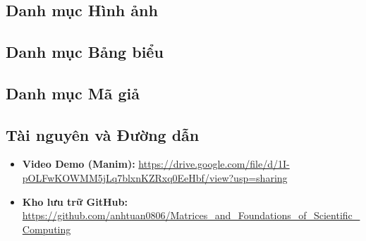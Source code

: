 \newpage
\setcounter{chapter}{4} %
\chapter*{}
{}

\section*{Danh mục Hình ảnh}
{}
\makeatletter
\vspace{-0.5cm} 
\makeatother

\section*{Danh mục Bảng biểu}
{}
\makeatletter
\vspace{-0.5cm}
\makeatother

\section*{Danh mục Mã giả}
{}
\makeatletter
\providecommand*{\l@algorithm}{\@dottedtocline{1}{1.5em}{2.3em}}
\vspace{-0.5cm}
\makeatother

\section*{Tài nguyên và Đường dẫn}
{}

\begin{itemize}
    \item \textbf{Video Demo (Manim):} \url{https://drive.google.com/file/d/1I-pOLFwKOWMM5jLq7blxnKZRxq0EeHbf/view?usp=sharing}
    \item \textbf{Kho lưu trữ GitHub:} \url{https://github.com/anhtuan0806/Matrices_and_Foundations_of_Scientific_Computing}
\end{itemize}